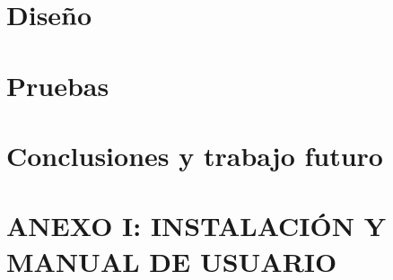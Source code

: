 \documentclass[b5paper,10pt,twoside]{book}
\begin{document}
	\chapter{Diseño}
	
	
	
	\chapter{Pruebas}
	
	
	
	\chapter{Conclusiones y trabajo futuro}
	
	
	
	\chapter{ANEXO I: INSTALACIÓN Y MANUAL DE USUARIO }
		
	
		
	
		
	
\end{document}
